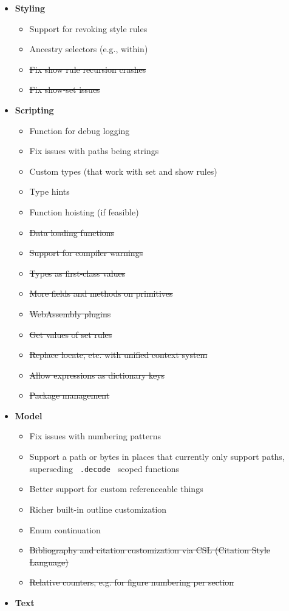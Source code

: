 \begin{itemize}
\item
  \textbf{Styling}

  \begin{itemize}
  \tightlist
  \item
    Support for revoking style rules
  \item
    Ancestry selectors (e.g., within)
  \item
    \st{Fix show rule recursion crashes}
  \item
    \st{Fix show-set issues}
  \end{itemize}
\item
  \textbf{Scripting}

  \begin{itemize}
  \tightlist
  \item
    Function for debug logging
  \item
    Fix issues with paths being strings
  \item
    Custom types (that work with set and show rules)
  \item
    Type hints
  \item
    Function hoisting (if feasible)
  \item
    \st{Data loading functions}
  \item
    \st{Support for compiler warnings}
  \item
    \st{Types as first-class values}
  \item
    \st{More fields and methods on primitives}
  \item
    \st{WebAssembly plugins}
  \item
    \st{Get values of set rules}
  \item
    \st{Replace locate, etc. with unified context system}
  \item
    \st{Allow expressions as dictionary keys}
  \item
    \st{Package management}
  \end{itemize}
\item
  \textbf{Model}

  \begin{itemize}
  \tightlist
  \item
    Fix issues with numbering patterns
  \item
    Support a path or bytes in places that currently only support paths,
    superseding \texttt{\ .decode\ } scoped functions
  \item
    Better support for custom referenceable things
  \item
    Richer built-in outline customization
  \item
    Enum continuation
  \item
    \st{Bibliography and citation customization via CSL (Citation Style
    Language)}
  \item
    \st{Relative counters, e.g. for figure numbering per section}
  \end{itemize}
\item
  \textbf{Text}


\end{itemize}
